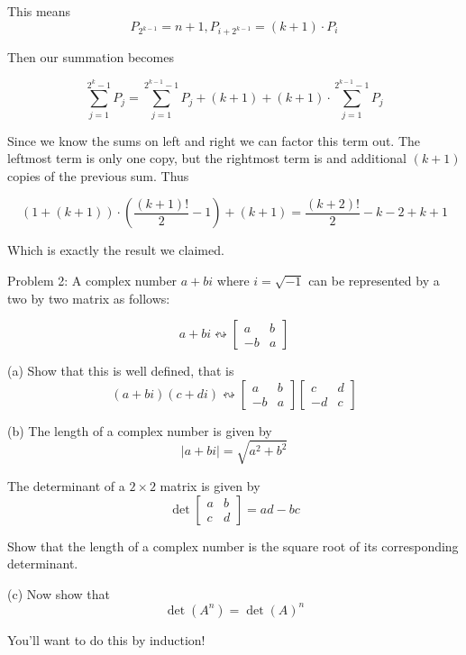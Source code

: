 \documentclass[16 pt]{amsart}
\theoremstyle{definition}
\theoremstyle{remark}
\numberwithin{equation}{subsection}
\begin{document}
This means
\[
P_{2^{k-1}} = n+1, P_{i+2^{k-1}} = (k+1)\cdot P_i
\]

Then our summation becomes

\[
\sum_{j=1}^{2^{k}-1} P_j = \sum_{j=1}^{2^{k-1}-1} P_j + (k+1) + (k+1)\cdot \sum_{j=1}^{2^{k-1}-1} P_j
\]

Since we know the sums on left and right we can factor this term out.  The leftmost term is only one copy, but the rightmost term is and additional $(k+1)$ copies of the previous sum.  Thus

\[
(1+(k+1)) \cdot \left(\frac{(k+1)!}{2} - 1\right) + (k+1)= \frac{(k+2)!}{2} - k - 2 + k + 1
\]

Which is exactly the result we claimed.

\newpage


Problem 2: A complex number $a+bi$ where $i = \sqrt{-1}$ can be represented by a two by two matrix as follows:

\[
a+bi \leftrightsquigarrow \begin{bmatrix}
a & b \\
-b & a
\end{bmatrix}
\]
\vspace{.25in}

(a) Show that this is well defined, that is
\[
(a+bi)(c+di) \leftrightsquigarrow 
\begin{bmatrix}
a & b \\
-b & a
\end{bmatrix}
\begin{bmatrix}
c & d \\
-d & c
\end{bmatrix}
\]

\vspace{.25in}

(b) The length of a complex number is given by
\[
|a+bi| = \sqrt{a^2+b^2}
\]

The determinant of a $2\times 2$ matrix is given by
\[
\det\begin{bmatrix}
a & b\\
c & d
\end{bmatrix} = ad - bc
\]

Show that the length of a complex number is the square root of its corresponding determinant.

\vspace{.25in}

(c) Now show that
\[
\det(A^n) = \det(A)^n
\]

You'll want to do this by induction!
\end{document}
